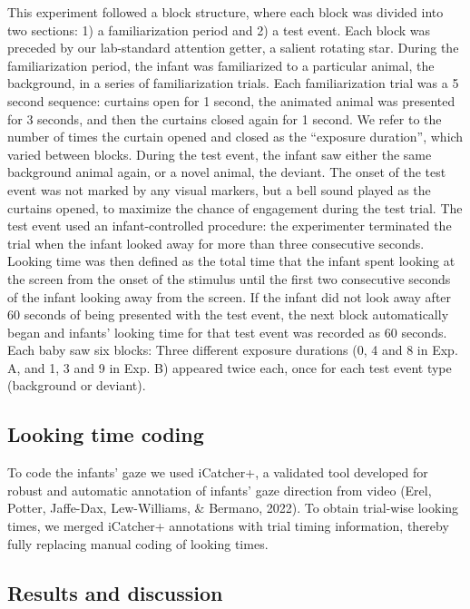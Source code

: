 \documentclass[10pt, letterpaper]{article}
\begin{document}
This experiment followed a block structure, where each block was divided
into two sections: 1) a familiarization period and 2) a test event. Each
block was preceded by our lab-standard attention getter, a salient
rotating star. During the familiarization period, the infant was
familiarized to a particular animal, the background, in a series of
familiarization trials. Each familiarization trial was a 5 second
sequence: curtains open for 1 second, the animated animal was presented
for 3 seconds, and then the curtains closed again for 1 second. We refer
to the number of times the curtain opened and closed as the ``exposure
duration'', which varied between blocks. During the test event, the
infant saw either the same background animal again, or a novel animal,
the deviant. The onset of the test event was not marked by any visual
markers, but a bell sound played as the curtains opened, to maximize the
chance of engagement during the test trial. The test event used an
infant-controlled procedure: the experimenter terminated the trial when
the infant looked away for more than three consecutive seconds. Looking
time was then defined as the total time that the infant spent looking at
the screen from the onset of the stimulus until the first two
consecutive seconds of the infant looking away from the screen. If the
infant did not look away after 60 seconds of being presented with the
test event, the next block automatically began and infants' looking time
for that test event was recorded as 60 seconds. Each baby saw six
blocks: Three different exposure durations (0, 4 and 8 in Exp. A, and 1,
3 and 9 in Exp. B) appeared twice each, once for each test event type
(background or deviant).

\hypertarget{looking-time-coding}{%
\subsection{Looking time coding}\label{looking-time-coding}}

To code the infants' gaze we used iCatcher+, a validated tool developed
for robust and automatic annotation of infants' gaze direction from
video (Erel, Potter, Jaffe-Dax, Lew-Williams, \& Bermano, 2022). To
obtain trial-wise looking times, we merged iCatcher+ annotations with
trial timing information, thereby fully replacing manual coding of
looking times.

\hypertarget{results-and-discussion-1}{%
\subsection{Results and discussion}\label{results-and-discussion-1}}
\end{document}
